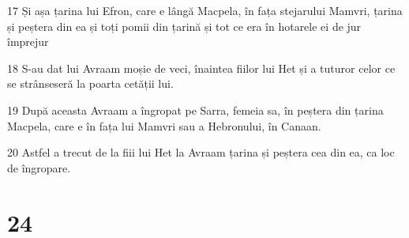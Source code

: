 \par 17 Și așa țarina lui Efron, care e lângă Macpela, în fața stejarului Mamvri, țarina și peștera din ea și toți pomii din țarină și tot ce era în hotarele ei de jur împrejur
\par 18 S-au dat lui Avraam moșie de veci, înaintea fiilor lui Het și a tuturor celor ce se strânseseră la poarta cetății lui.
\par 19 După aceasta Avraam a îngropat pe Sarra, femeia sa, în peștera din țarina Macpela, care e în fața lui Mamvri sau a Hebronului, în Canaan.
\par 20 Astfel a trecut de la fiii lui Het la Avraam țarina și peștera cea din ea, ca loc de îngropare.

\chapter{24}


